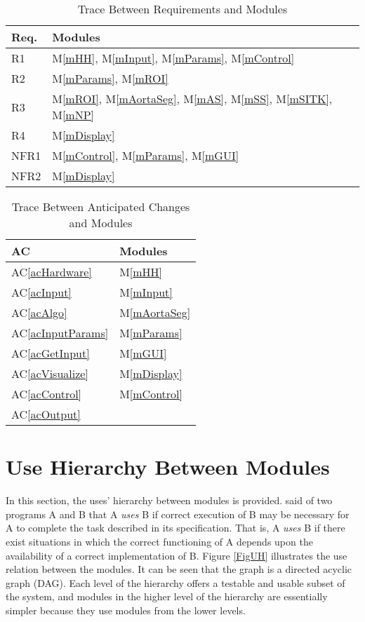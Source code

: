 \documentclass[12pt, titlepage]{article}
\newcommand{\acref}[1]{AC\ref{#1}}
\newcommand{\mref}[1]{M\ref{#1}}
\begin{document}
\begin{table}[H]
\centering
\begin{tabular}{p{} p{}}
\toprule
\textbf{Req.} & \textbf{Modules}\\
\midrule
R1 & \mref{mHH}, \mref{mInput}, \mref{mParams}, \mref{mControl}\\
R2 & \mref{mParams}, \mref{mROI}\\
R3 & \mref{mROI}, \mref{mAortaSeg}, \mref{mAS}, \mref{mSS}, \mref{mSITK}, \mref{mNP}\\
R4 & \mref{mDisplay}\\
NFR1 & \mref{mControl}, \mref{mParams}, \mref{mGUI}\\
NFR2 & \mref{mDisplay}\\
\bottomrule
\end{tabular}
\caption{Trace Between Requirements and Modules}
\label{TblRT}
\end{table}

\begin{table}[H]
\centering
\begin{tabular}{p{} p{}}
\toprule
\textbf{AC} & \textbf{Modules}\\
\midrule
\acref{acHardware} & \mref{mHH}\\
\acref{acInput} & \mref{mInput}\\
\acref{acAlgo} & \mref{mAortaSeg}\\
\acref{acInputParams} & \mref{mParams}\\
\acref{acGetInput} & \mref{mGUI}\\
\acref{acVisualize} & \mref{mDisplay}\\
\acref{acControl} & \mref{mControl}\\
\acref{acOutput} & \\
\bottomrule
\end{tabular}
\caption{Trace Between Anticipated Changes and Modules}
\label{TblACT}
\end{table}

\section{Use Hierarchy Between Modules} \label{SecUse}

In this section, the uses' hierarchy between modules is
provided. \citet{Parnas1978} said of two programs A and B that A {\em uses} B if
correct execution of B may be necessary for A to complete the task described in
its specification. That is, A {\em uses} B if there exist situations in which
the correct functioning of A depends upon the availability of a correct
implementation of B.  Figure \ref{FigUH} illustrates the use relation between
the modules. It can be seen that the graph is a directed acyclic graph
(DAG). Each level of the hierarchy offers a testable and usable subset of the
system, and modules in the higher level of the hierarchy are essentially simpler
because they use modules from the lower levels.
\end{document}
